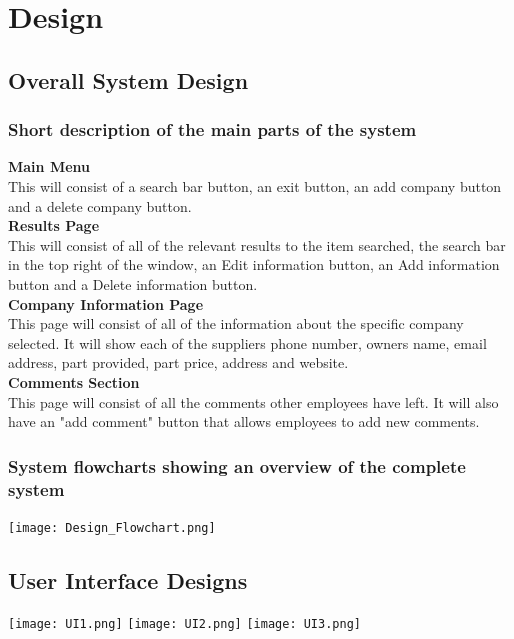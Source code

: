 \chapter{Design}

\section{Overall System Design}

\subsection{Short description of the main parts of the system}
\textbf{Main Menu}\\
This will consist of a search bar button, an exit button, an add company button and a delete company button.\\
\textbf{Results Page}\\
This will consist of all of the relevant results to the item searched, the search bar in the top right of the window, an Edit information button, an Add information button and a Delete information button.\\
\textbf{Company Information Page}\\
This page will consist of all of the information about the specific company selected. It will show each of the suppliers phone number, owners name, email address, part provided, part price, address and website.\\
\textbf{Comments Section}\\
This page will consist of all the comments other employees have left. It will also have an "add comment" button that allows employees to add new comments.\\

\subsection{System flowcharts showing an overview of the complete system}
\begin{center}
\texttt{[image: Design\_Flowchart.png]}
\end{center}
\section{User Interface Designs}

\begin{center}
\texttt{[image: UI1.png]}
\texttt{[image: UI2.png]}
\texttt{[image: UI3.png]}
\end{center}

